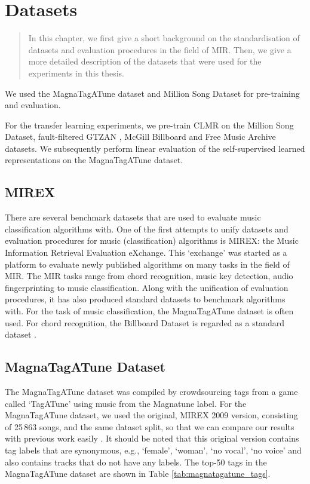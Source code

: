 \chapter{Datasets}

\begin{quote}
    In this chapter, we first give a short background on the standardisation of datasets and evaluation procedures in the field of MIR. Then, we give a more detailed description of the datasets that were used for the experiments in this thesis.
\end{quote}

We used the MagnaTagATune dataset and Million Song Dataset \cite{Bertin-Mahieux2011} for pre-training and evaluation.

For the transfer learning experiments, we pre-train CLMR on the Million Song Dataset, fault-filtered GTZAN \cite{tzanetakis2002musical,sturm2013gtzan}, McGill Billboard \cite{burgoyne_billboard} and Free Music Archive \cite{fma_dataset} datasets.
We subsequently perform linear evaluation of the self-supervised learned representations on the MagnaTagATune dataset.

\section{MIREX}
There are several benchmark datasets that are used to evaluate music classification algorithms with.
One of the first attempts to unify datasets and evaluation procedures for music (classification) algorithms is MIREX: the Music Information Retrieval Evaluation eXchange.
This `exchange' was started as a platform to evaluate newly published algorithms on many tasks in the field of MIR.
The MIR tasks range from chord recognition, music key detection, audio fingerprinting to music classification.
Along with the unification of evaluation procedures, it has also produced standard datasets to benchmark algorithms with.
For the task of music classification, the MagnaTagATune dataset \cite{law2009evaluation} is often used.
For chord recognition, the Billboard Dataset is regarded as a standard dataset \cite{burgoyne_billboard}.


\section{MagnaTagATune Dataset}
The MagnaTagATune dataset was compiled by crowdsourcing tags from a game called `TagATune' using music from the Magnatune label.
For the MagnaTagATune dataset, we used the original, MIREX 2009 version, consisting of 25\,863 songs, and the same dataset split, so that we can compare our results with previous work easily \cite{pons_end--end_2017, lee2018samplecnn, dieleman_feature_learning}.
It should be noted that this original version contains tag labels that are synonymous, e.g., `female', `woman', `no vocal', `no voice' and also contains tracks that do not have any labels. The top-50 tags in the MagnaTagATune dataset are shown in Table \ref{tab:magnatagatune_tags}.


